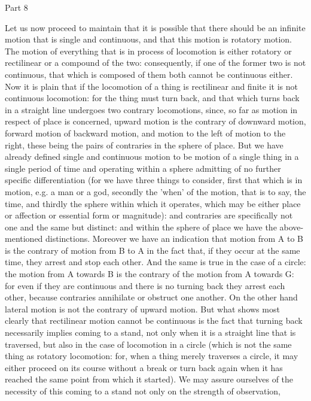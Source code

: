 Part 8

Let us now proceed to maintain that it is possible that there should
be an infinite motion that is single and continuous, and that this
motion is rotatory motion. The motion of everything that is in process
of locomotion is either rotatory or rectilinear or a compound of the
two: consequently, if one of the former two is not continuous, that
which is composed of them both cannot be continuous either. Now it
is plain that if the locomotion of a thing is rectilinear and finite
it is not continuous locomotion: for the thing must turn back, and
that which turns back in a straight line undergoes two contrary locomotions,
since, so far as motion in respect of place is concerned, upward motion
is the contrary of downward motion, forward motion of backward motion,
and motion to the left of motion to the right, these being the pairs
of contraries in the sphere of place. But we have already defined
single and continuous motion to be motion of a single thing in a single
period of time and operating within a sphere admitting of no further
specific differentiation (for we have three things to consider, first
that which is in motion, e.g. a man or a god, secondly the 'when'
of the motion, that is to say, the time, and thirdly the sphere within
which it operates, which may be either place or affection or essential
form or magnitude): and contraries are specifically not one and the
same but distinct: and within the sphere of place we have the above-mentioned
distinctions. Moreover we have an indication that motion from A to
B is the contrary of motion from B to A in the fact that, if they
occur at the same time, they arrest and stop each other. And the same
is true in the case of a circle: the motion from A towards B is the
contrary of the motion from A towards G: for even if they are continuous
and there is no turning back they arrest each other, because contraries
annihilate or obstruct one another. On the other hand lateral motion
is not the contrary of upward motion. But what shows most clearly
that rectilinear motion cannot be continuous is the fact that turning
back necessarily implies coming to a stand, not only when it is a
straight line that is traversed, but also in the case of locomotion
in a circle (which is not the same thing as rotatory locomotion: for,
when a thing merely traverses a circle, it may either proceed on its
course without a break or turn back again when it has reached the
same point from which it started). We may assure ourselves of the
necessity of this coming to a stand not only on the strength of observation,

